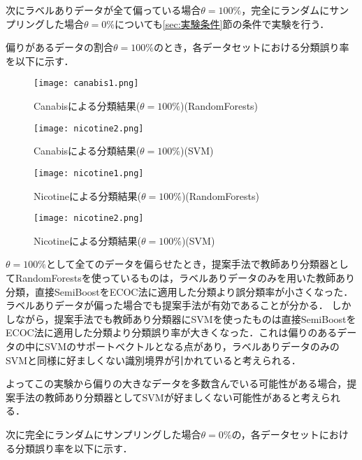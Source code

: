 次にラベルありデータが全て偏っている場合$\theta=100\%$，完全にランダムにサンプリングした場合$\theta=0\%$についても\ref{sec:実験条件}節の条件で実験を行う．\par
偏りがあるデータの割合$\theta=100\%$のとき，各データセットにおける分類誤り率を以下に示す．

\begin{figure}[H]
\centering
\texttt{[image: canabis1.png]}
\caption{Canabisによる分類結果($\theta=100\%$)(RandomForests)}
\label{canabis1}
\end{figure}\par
\begin{figure}[H]
\centering
\texttt{[image: nicotine2.png]}
\caption{Canabisによる分類結果($\theta=100\%$)(SVM)}
\label{canabis2}
\end{figure}\par



\begin{figure}[H]
\centering
\texttt{[image: nicotine1.png]}
\caption{Nicotineによる分類結果($\theta=100\%$)(RandomForests)}
\label{nicotine1}
\end{figure}\par
\begin{figure}[H]
\centering
\texttt{[image: nicotine2.png]}
\caption{Nicotineによる分類結果($\theta=100\%$)(SVM)}
\label{nicotine2}
\end{figure}\par

$\theta=100\%$として全てのデータを偏らせたとき，提案手法で教師あり分類器としてRandomForestsを使っているものは，ラベルありデータのみを用いた教師あり分類，直接SemiBoostをECOC法に適用した分類より誤分類率が小さくなった．ラベルありデータが偏った場合でも提案手法が有効であることが分かる．
しかしながら，提案手法でも教師あり分類器にSVMを使ったものは直接SemiBoostをECOC法に適用した分類より分類誤り率が大きくなった．これは偏りのあるデータの中にSVMのサポートベクトルとなる点があり，ラベルありデータのみのSVMと同様に好ましくない識別境界が引かれていると考えられる．\par
よってこの実験から偏りの大きなデータを多数含んでいる可能性がある場合，提案手法の教師あり分類器としてSVMが好ましくない可能性があると考えられる．\par

次に完全にランダムにサンプリングした場合$\theta=0\%$の，各データセットにおける分類誤り率を以下に示す．\par

